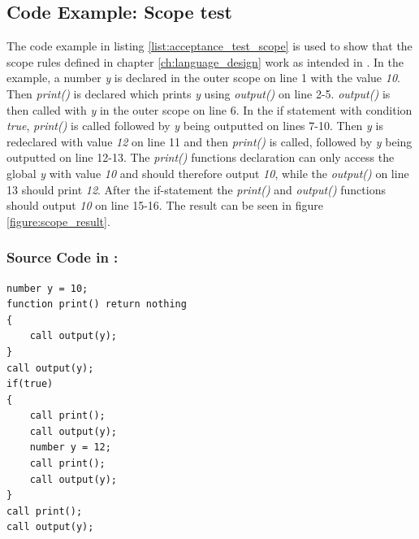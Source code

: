 
\subsection{Code Example: Scope test} \label{test_scopee}
The code example in listing \ref{list:acceptance_test_scope} is used to show that the scope rules defined in chapter \ref{ch:language_design} work as intended in \lang. In the example, a number \textit{y} is declared in the outer scope on line 1 with the value \textit{10}. Then \textit{print()} is declared which prints \textit{y} using \textit{output()} on line 2-5. \textit{output()} is then called with \textit{y} in the outer scope on line 6. In the if statement with condition \textit{true}, \textit{print()} is called followed by \textit{y} being outputted on lines 7-10. Then \textit{y} is redeclared with value \textit{12} on line 11 and then \textit{print()} is called, followed by \textit{y} being outputted on line 12-13. The \textit{print()} functions declaration can only access the global \textit{y} with value \textit{10} and should therefore output \textit{10},  while the \textit{output()} on line 13 should print \textit{12}. After the if-statement the \textit{print()} and \textit{output()} functions should output \textit{10} on line 15-16. The result can be seen in figure \ref{figure:scope_result}.

\newpage
\subsubsection{Source Code in \lang:}
\begin{lstlisting}[language = scriptkid, firstnumber=1, label={list:acceptance_test_scope}, caption=Acceptance test scope code examples]
number y = 10; 
function print() return nothing 
{ 
    call output(y); 
} 
call output(y);
if(true) 
{	 
    call print(); 
    call output(y);
    number y = 12; 
    call print(); 
    call output(y);
}
call print();
call output(y);
\end{lstlisting}

